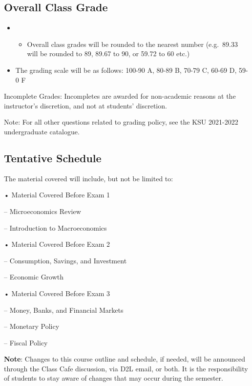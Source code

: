 \documentclass[11pt,]{article}
\providecommand{\tightlist}{%
  \setlength{\itemsep}{0pt}\setlength{\parskip}{0pt}}
\begin{document}
\hypertarget{overall-class-grade}{%
\subsection{Overall Class Grade}\label{overall-class-grade}}

\begin{itemize}
\item
  \begin{itemize}
  \tightlist
  \item
    Overall class grades will be rounded to the nearest number (e.g.~89.33 will be rounded to 89, 89.67 to
    90, or 59.72 to 60 etc.)
  \end{itemize}
\item
  The grading scale will be as follows: 100-90 A, 80-89 B, 70-79 C, 60-69 D, 59-0 F
\end{itemize}

Incomplete Grades: Incompletes are awarded for non-academic reasons at the instructor's discretion, and
not at students' discretion.

Note: For all other questions related to grading policy, see the KSU 2021-2022 undergraduate catalogue.
\newpage

\hypertarget{tentative-schedule}{%
\subsection*{Tentative Schedule}\label{tentative-schedule}}

The material covered will include, but not be limited to:

• Material Covered Before Exam 1

-- Microeconomics Review

-- Introduction to Macroeconomics

• Material Covered Before Exam 2

-- Consumption, Savings, and Investment

-- Economic Growth

• Material Covered Before Exam 3

-- Money, Banks, and Financial Markets

-- Monetary Policy

-- Fiscal Policy

\textbf{Note}: Changes to this course outline and schedule, if needed, will be announced through the Class Cafe
discussion, via D2L email, or both. It is the responsibility of students to stay aware of changes that may occur
during the semester.
\end{document}
